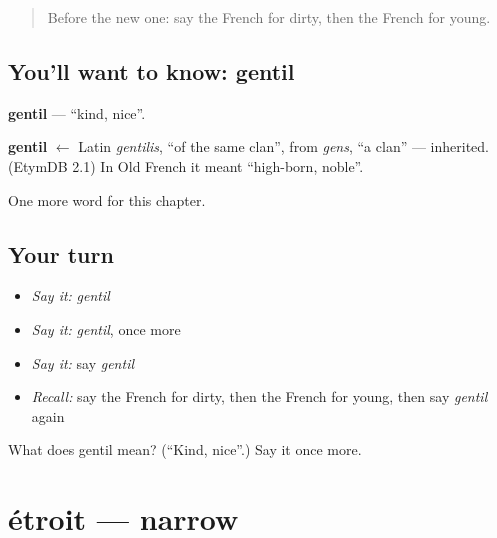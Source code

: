 \label{lesson:FR-C92-gentil}



\begin{quote}
Before the new one: say the French for dirty, then the French for young.
\end{quote}

\subsection*{You'll want to know: gentil}
\textbf{gentil} — \textquotedblleft{}kind, nice\textquotedblright{}.

\begin{cousinweb}
\textbf{gentil} $\leftarrow$ Latin \emph{gentilis}, \textquotedblleft{}of the same clan\textquotedblright{}, from \emph{gens}, \textquotedblleft{}a clan\textquotedblright{} — inherited. (EtymDB 2.1) In Old French it meant \textquotedblleft{}high-born, noble\textquotedblright{}.
\end{cousinweb}

\begin{grammarlens}[title={What you've built}]
One more word for this chapter.
\end{grammarlens}

\subsection*{Your turn}
\begin{itemize}
\raggedright
  \item \emph{Say it:} \emph{gentil}
  \item \emph{Say it:} \emph{gentil}, once more
  \item \emph{Say it:} say \emph{gentil}
  \item \emph{Recall:} say the French for dirty, then the French for young, then say \emph{gentil} again
\end{itemize}

\begin{tcolorbox}[breakable,colback=teal!4,colframe=teal!35!black,title={Before you move on}]
What does gentil mean? (\textquotedblleft{}Kind, nice\textquotedblright{}.) Say it once more.
\end{tcolorbox}
\section[étroit]{étroit — narrow}

\label{lesson:FR-C92-etroit}




